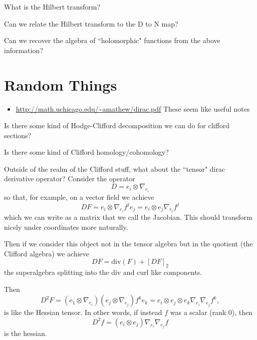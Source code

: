 \begin{question}
What is the Hilbert transform?
\end{question}

\begin{question}
Can we relate the Hilbert transform to the D to N map?
\end{question}

\begin{question}
Can we recover the algebra of ``holomorphic" functions from the above information?
\end{question}

\section{Random Things}


\begin{itemize}
    \item \url{http://math.uchicago.edu/~amathew/dirac.pdf} These seem like useful notes
\end{itemize}

\begin{question}
    Is there some kind of Hodge-Clifford decomposition we can do for clifford sections?
\end{question}

\begin{question}
Is there some kind of Clifford homology/cohomology?
\end{question}

Outside of the realm of the Clifford stuff, what about the ``tensor" dirac derivative operator?  Consider the operator
\[
D = e_i \otimes \nabla_{e_i}
\]
so that, for example, on a vector field we achieve
\[
DF = e_i \otimes \nabla_{e_i}f^j e_j = e_i \otimes e_j \nabla_{e_i} f^j
\]
which we can write as a matrix that we call the Jacobian. This should transform nicely under coordinates more naturally.

Then if we consider this object not in the tensor algebra but in the quotient (the Clifford algebra) we achieve
\[
DF = \textrm{div}(F) + [DF]_2
\]
the superalgebra splitting into the div and curl like components.

Then
\[
D^2F = (e_1 \otimes \nabla_{e_i})(e_j\otimes \nabla_{e_j})f^ke_{k} = e_i \otimes e_j \otimes e_k \nabla_{e_i} \nabla_{e_j} f^k,
\]
is like the Hessian tensor. In other words, if instead $f$ was a scalar (rank 0), then
\[
D^2f = (e_i \otimes e_j) \nabla_{e_i} \nabla_{e_j} f
\]
is the hessian.


